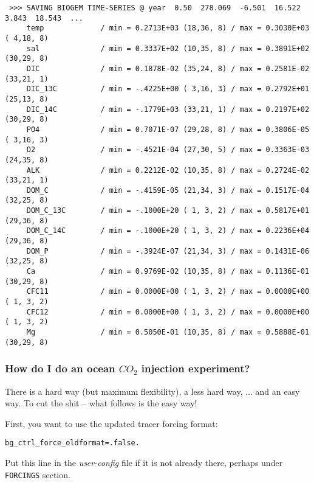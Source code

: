 \documentclass[11pt,fleqn]{book} %
\begin{document}
\vspace{-2mm}\footnotesize\begin{verbatim}
 >>> SAVING BIOGEM TIME-SERIES @ year  0.50  278.069  -6.501  16.522  3.843  18.543  ...
     temp             / min = 0.2713E+03 (18,36, 8) / max = 0.3030E+03 ( 4,18, 8)
     sal              / min = 0.3337E+02 (10,35, 8) / max = 0.3891E+02 (30,29, 8)
     DIC              / min = 0.1878E-02 (35,24, 8) / max = 0.2581E-02 (33,21, 1)
     DIC_13C          / min = -.4225E+00 ( 3,16, 3) / max = 0.2792E+01 (25,13, 8)
     DIC_14C          / min = -.1779E+03 (33,21, 1) / max = 0.2197E+02 (30,29, 8)
     PO4              / min = 0.7071E-07 (29,28, 8) / max = 0.3806E-05 ( 3,16, 3)
     O2               / min = -.4521E-04 (27,30, 5) / max = 0.3363E-03 (24,35, 8)
     ALK              / min = 0.2212E-02 (10,35, 8) / max = 0.2724E-02 (33,21, 1)
     DOM_C            / min = -.4159E-05 (21,34, 3) / max = 0.1517E-04 (32,25, 8)
     DOM_C_13C        / min = -.1000E+20 ( 1, 3, 2) / max = 0.5817E+01 (29,36, 8)
     DOM_C_14C        / min = -.1000E+20 ( 1, 3, 2) / max = 0.2236E+04 (29,36, 8)
     DOM_P            / min = -.3924E-07 (21,34, 3) / max = 0.1431E-06 (32,25, 8)
     Ca               / min = 0.9769E-02 (10,35, 8) / max = 0.1136E-01 (30,29, 8)
     CFC11            / min = 0.0000E+00 ( 1, 3, 2) / max = 0.0000E+00 ( 1, 3, 2)
     CFC12            / min = 0.0000E+00 ( 1, 3, 2) / max = 0.0000E+00 ( 1, 3, 2)
     Mg               / min = 0.5050E-01 (10,35, 8) / max = 0.5888E-01 (30,29, 8)
\end{verbatim}\normalsize

%
\subsubsection{How do I do an ocean \(CO_{2}\) injection experiment?}

There is a hard way (but maximum flexibility), a less hard way, ... and an easy way. To cut the shit -- what follows is the easy way!

\vspace{1mm}
First, you want to use the updated tracer forcing format:
\vspace{-2mm}\small\begin{verbatim}
bg_ctrl_force_oldformat=.false.
\end{verbatim}\normalsize\vspace{-2mm}
Put this line in the \textit{user-config} file if it is not already there, perhaps under \texttt{FORCINGS} section.
\end{document}
